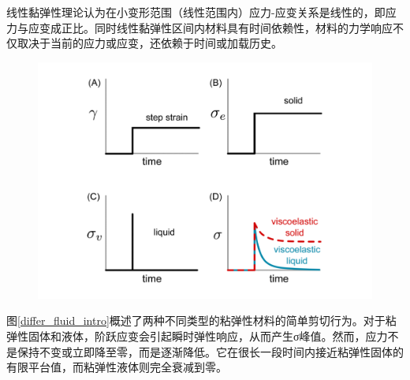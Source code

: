 线性黏弹性理论认为在小变形范围（线性范围内）应力-应变关系是线性的，即应力与应变成正比。同时线性黏弹性区间内材料具有时间依赖性，材料的力学响应不仅取决于当前的应力或应变，还依赖于时间或加载历史。
\begin{figure}[htbp]
	\centering
	\includegraphics[width=\textwidth]{Fig/solid_liquid.pdf}
\end{figure}
图\ref{differ_fluid_intro}概述了两种不同类型的粘弹性材料的简单剪切行为。对于粘弹性固体和液体，阶跃应变会引起瞬时弹性响应，从而产生σ峰值。然而，应力不是保持不变或立即降至零，而是逐渐降低。它在很长一段时间内接近粘弹性固体的有限平台值，而粘弹性液体则完全衰减到零\cite{ricarteTutorialReviewLinear2024}。

